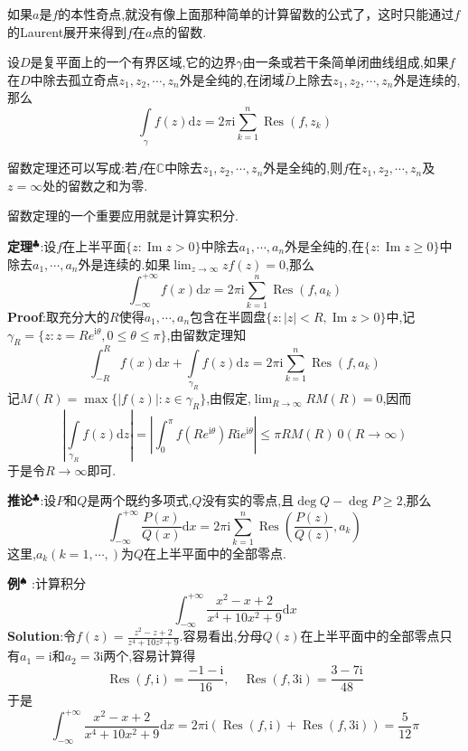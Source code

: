 \qquad 如果$a$是$f$的本性奇点,就没有像上面那种简单的计算留数的公式了，这时只能通过$f$的Laurent展开来得到$f$在$a$点的留数.
\begin{tcolorbox}[colback=KuangNei,colframe=BianKuang,title=\textbf{留数定理},sharpish corners]
    设$D$是复平面上的一个有界区域,它的边界$\gamma$由一条或若干条简单闭曲线组成,如果$f$在$D$中除去孤立奇点$z_1,z_2,\cdots,z_n$外是全纯的,在闭域$\overline{D}$上除去$z_1,z_2,\cdots,z_n$外是连续的,那么
    $$
    \int\limits_{\gamma}f(z)\mathrm{d}z=2\pi\mathrm{i}\sum^n_{k=1}\operatorname{Res}(f,z_k)
    $$
\end{tcolorbox}
留数定理还可以写成:若$f$在$\mathbb{C}$中除去$z_1,z_2,\cdots,z_n$外是全纯的,则$f$在$z_1,z_2,\cdots,z_n$及$z=\infty$处的留数之和为零.\par
留数定理的一个重要应用就是计算实积分.\par
\textbf{定理}$^\clubsuit$:设$f$在上半平面$\{z:\operatorname{Im}z>0\}$中除去$a_1,\cdots,a_n$外是全纯的,在$\{z:\operatorname{Im}z\geqslant 0\}$中除去$a_1,\cdots,a_n$外是连续的.如果$\lim_{z\to \infty}zf(z)=0$,那么
$$
\int_{-\infty}^{+\infty}f(x)\mathrm{d}x=2\pi\mathrm{i}\sum^n_{k=1}\operatorname{Res}(f,a_k)
$$
\qquad \textbf{Proof}:取充分大的$R$使得$a_1,\cdots,a_n$包含在半圆盘$\{z:|z|<R,\operatorname{Im}z>0\}$中,记$\gamma_R=\{z:z=Re^{\mathrm{i}\theta},0\leqslant \theta\leqslant \pi\}$,由留数定理知
$$
\int^R_{-R}f(x)\mathrm{d}x+\int\limits_{\gamma_R}f(z)\mathrm{d}z=2\pi\mathrm{i}\sum^n_{k=1}\operatorname{Res}(f,a_k)
$$
记$M(R)=\max\{|f(z)|:z\in\gamma_R\}$,由假定,$\lim_{R\to \infty}RM(R)=0$,因而
$$
\left|\int\limits_{\gamma_R}f(z)\mathrm{d}z\right|=\left|\int^\pi_0f(Re^{\mathrm{i}\theta})R\mathrm{i}e^{\mathrm{i}\theta}\right|\leqslant\pi RM(R)\ 0(R\to\infty)
$$
于是令$R\to\infty$即可.\par
\textbf{推论}$^\clubsuit$:设$P$和$Q$是两个既约多项式,$Q$没有实的零点,且$\deg Q-\deg P\geqslant 2$,那么
$$
\int_{-\infty}^{+\infty}\frac{P(x)}{Q(x)}\mathrm{d}x=2\pi\mathrm{i}\sum^n_{k=1}\operatorname{Res}(\frac{P(z)}{Q(z)},a_k)
$$
这里,$a_k(k=1,\cdots,)$为$Q$在上半平面中的全部零点.\par
\textbf{例}$^\spadesuit$ :计算积分
$$
\int_{-\infty}^{+\infty}\frac{x^2-x+2}{x^4+10x^2+9}\mathrm{d}x
$$
\qquad \textbf{Solution}:令$f(z)=\frac{z^2-z+2}{z^4+10z^2+9}$.容易看出,分母$Q(z)$在上半平面中的全部零点只有$a_1=\mathrm{i}$和$a_2=3\mathrm{i}$两个,容易计算得
$$
\operatorname{Res}(f,\mathrm{i})=\frac{-1-\mathrm{i}}{16},\quad \operatorname{Res}(f,3\mathrm{i})=\frac{3-7\mathrm{i}}{48}
$$
于是
$$
\int_{-\infty}^{+\infty}\frac{x^2-x+2}{x^4+10x^2+9}\mathrm{d}x=2\pi\mathrm{i}(\operatorname{Res}(f,\mathrm{i})+\operatorname{Res}(f,3\mathrm{i}))=\frac{5}{12}\pi
$$
